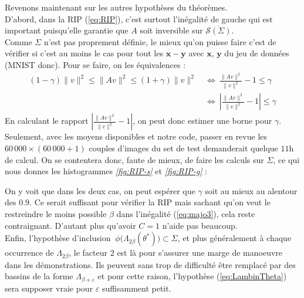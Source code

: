 \documentclass[hidelinks, french]{article} %
\newcommand{\Llr}{\Longleftrightarrow}
\renewcommand{\epsilon}{\varepsilon}
\renewcommand{\leq}{\leqslant}
\renewcommand{\bf}[1]{\boldsymbol{#1}}
\theoremstyle{enonce}
\theoremstyle{special}
\theoremstyle{rq}
\theoremstyle{exo}
\theoremstyle{demo}
\begin{document}
Revenons maintenant sur les autres hypothèses du théorèmes. 
\\
D'abord, dans la RIP (\ref{eq:RIP}), c'est surtout l'inégalité de gauche qui est important puisqu'elle garantie que $A$ soit inversible sur $\overline{\mathcal{S}(\Sigma)}$.
\\
Comme $\Sigma$ n'est pas proprement définie, le mieux qu'on puisse faire c'est de vérifier si c'est au moins le cas pour tout les $\bf{x}-\bf{y}$ avec $\bf{x}$, $\bf{y}$ du jeu de données (MNIST donc). Pour se faire, on les équivalences :
\begin{align*}(1-\gamma)\|v\|^2\leq \|Av\|^2\leq (1+\gamma)\|v\|^2\ &\Llr\ \frac{\|Av\|^2}{\|v\|^2}-1\leq \gamma\\
    &\Llr\ \left|\frac{\|Av\|^2}{\|v\|^2}-1\right|\leq \gamma\end{align*}
En calculant le rapport $\left|\frac{\|Av\|^2}{\|v\|^2}-1\right|$, on peut donc estimer une borne pour $\gamma$. Seulement, avec les moyens disponibles et notre code, passer en revue les $60\,000\times(60\,000+1)$ couples d'images du set de test demanderait quelque $11$h de calcul. On se contentera donc, faute de mieux, de faire les calculs sur $\Sigma$, ce qui nous donnes les histogrammes \textit{\ref{fig:RIP-s}} et \textit{\ref{fig:RIP-g}} :
\\

\begin{figure}[h]
\begin{floatrow}
{}

{}
\end{floatrow}\end{figure}

\noindent On y voit que dans les deux cas, on peut espérer que $\gamma$ soit au mieux au alentour des $0.9$. Ce serait suffisant pour vérifier la RIP mais sachant qu'on veut le restreindre le moins possible $\beta$ dans l'inégalité (\ref{eq:majo3}), cela reste contraignant. D'autant plus qu'avoir $C=1$ n'aide pas beaucoup.
\\

Enfin, l'hypothèse d'inclusion $\ \phi\big(\Lambda_{2\beta}(\theta^*)\big)\subset\Sigma$, et plus généralement à chaque occurrence de $\Lambda_{2\beta}$, le facteur $2$ est là pour s'assurer une marge de manoeuvre dans les démonstrations. Ils peuvent sans trop de difficulté être remplacé par des bassins de la forme $\Lambda_{\beta+\epsilon}$ et pour cette raison, l’hypothèse (\ref{eq:LambinTheta}) sera supposer vraie pour $\epsilon$ suffisamment petit.
\\
\end{document}
